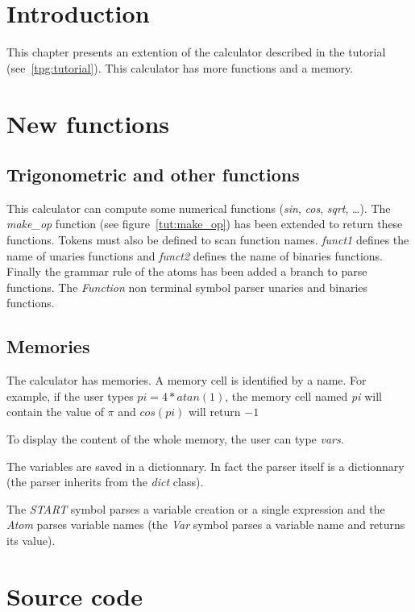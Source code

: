 \section{Introduction}

This chapter presents an extention of the calculator described in the tutorial (see~\ref{tpg:tutorial}).
This calculator has more functions and a memory.

\section{New functions}

\subsection{Trigonometric and other functions}

This calculator can compute some numerical functions (\emph{sin}, \emph{cos}, \emph{sqrt}, \ldots).
The \emph{make\_op} function (see figure~\ref{tut:make_op}) has been extended to return these functions.
Tokens must also be defined to scan function names.
\emph{funct1} defines the name of unaries functions and \emph{funct2} defines the name of binaries functions.
Finally the grammar rule of the atoms has been added a branch to parse functions.
The \emph{Function} non terminal symbol parser unaries and binaries functions.

\subsection{Memories}

The calculator has memories.
A memory cell is identified by a name.
For example, if the user types \emph{$pi = 4*atan(1)$}, the memory cell named \emph{pi} will contain the value of \emph{$\pi$} and \emph{$cos(pi)$} will return \emph{$-1$}

To display the content of the whole memory, the user can type \emph{vars}.

The variables are saved in a dictionnary.
In fact the parser itself is a dictionnary (the parser inherits from the \emph{dict} class).

The \emph{START} symbol parses a variable creation or a single expression and the \emph{Atom} parses variable names (the \emph{Var} symbol parses a variable name and returns its value).

\section{Source code}

